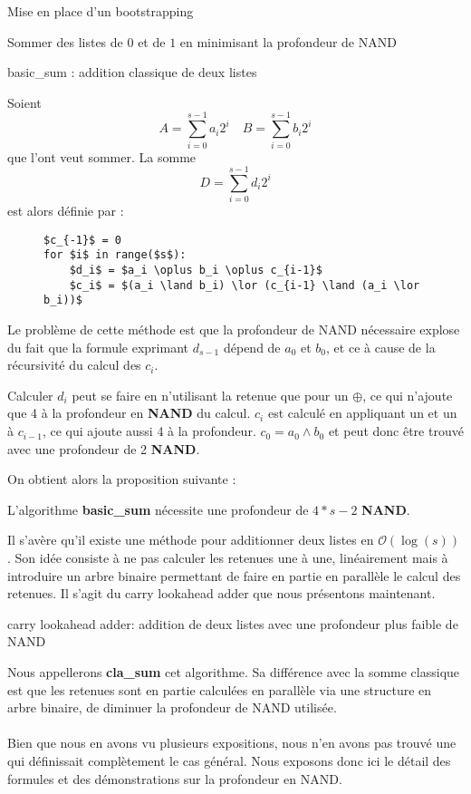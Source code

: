\begin{section}{Mise en place d'un bootstrapping}
\begin{subsection}{Sommer des listes de $0$ et de $1$ en minimisant la profondeur de NAND}
\begin{subsubsection}{basic\_sum : addition classique de deux listes}
	
Soient 
\[ A = \sum_{i=0}^{s-1} a_i 2^i \quad B = \sum_{i=0}^{s-1} b_i 2^i\]
que l'ont veut sommer. La somme
\[D =\sum_{i=0}^{s-1} d_i 2^i\]
est alors définie par :
	
\begin{figure}[!h]
\begin{lstlisting}
$c_{-1}$ = 0
for $i$ in range($s$):
	$d_i$ = $a_i \oplus b_i \oplus c_{i-1}$
	$c_i$ = $(a_i \land b_i) \lor (c_{i-1} \land (a_i \lor b_i))$
\end{lstlisting}
\end{figure}

Le problème de cette méthode est que la profondeur de NAND nécessaire explose du fait que la formule exprimant
$d_{s-1}$ dépend de $a_0$ et $b_0$, et ce à cause de la récursivité du calcul des $c_i$.

Calculer $d_i$ peut se faire en n'utilisant la retenue que pour un $\oplus$, ce qui n'ajoute que 4 à la profondeur en \textbf{NAND} du calcul. $c_i$ est calculé en appliquant un  et un  à $c_{i-1}$, ce qui ajoute aussi 4 à la profondeur. $c_0 = a_0 \land b_0$ et peut donc être trouvé avec une profondeur de 2 \textbf{NAND}.
	
	On obtient alors la proposition suivante :
\begin{prop}
	L'algorithme \textbf{basic\_sum} nécessite une profondeur de $4*s - 2$ \textbf{NAND}.
\end{prop}


Il s'avère qu'il existe une méthode pour additionner deux listes en $\mathcal{O}(\log(s))$. 
Son idée consiste à ne pas calculer les retenues une à une, \og linéairement \fg mais à 
introduire un arbre binaire permettant de faire en partie en parallèle le calcul des retenues.
Il s'agit du carry lookahead adder que nous présentons maintenant.

\end{subsubsection}
\begin{subsubsection}{carry lookahead adder: addition de deux listes avec une profondeur plus faible de NAND}

Nous appellerons \textbf{cla\_sum} cet algorithme. Sa différence avec la somme classique est que les retenues
sont en partie calculées en parallèle via une structure en arbre binaire, de diminuer la profondeur de NAND utilisée.

\paragraph{}
Bien que nous en avons vu plusieurs expositions, nous n'en avons pas trouvé 
une qui définissait complètement le cas général.  Nous exposons donc ici le détail des formules et des démonstrations sur la profondeur en NAND.


\end{subsubsection}
\end{subsection}
\end{section}
